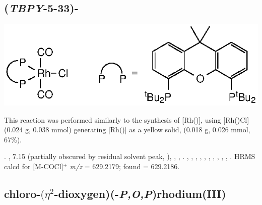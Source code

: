 
\subsection*{(\emph{TBPY}-5-33)-}

\begin{structure}[h]
\begin{center}
\includegraphics{../Structures/RhCl(CtBu)(CO)2.eps}
\end{center}
\end{structure}

This reaction was performed similarly to the synthesis of [Rh(\tBusixantphos)], using [Rh(\tBuxantphos)Cl] (0.024 g, 0.038 mmol) generating [Rh(\tBuxantphos)] as a yellow solid, (0.018 g, 0.026 mmol, 67\%).  

.
,
7.15 (partially obscured by residual solvent peak, \CtBuaH),
,
,
.
,
,
,
,
,
,
,
,
,
,
.
HRMS calcd for  [M-COCl]$^+$ \emph{m/z} = 629.2179; found = 629.2186.



\subsection*{chloro-$(\eta^2$-dioxygen)(\tBusixantphosk-\emph{P,O,P})rhodium(III)}


